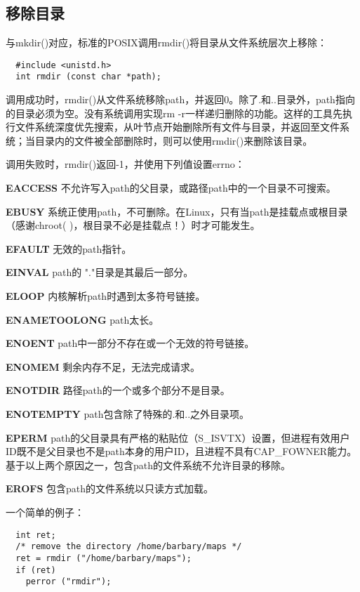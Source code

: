 \subsection{移除目录}

与mkdir()对应，标准的POSIX调用rmdir()将目录从文件系统层次上移除：

\begin{lstlisting}
  #include <unistd.h>
  int rmdir (const char *path);
\end{lstlisting}

调用成功时，rmdir()从文件系统移除path，并返回0。除了.和..目录外，path指向的目录必须为空。没有系统调用实现rm -r一样递归删除的功能。这样的工具先执行文件系统深度优先搜索，从叶节点开始删除所有文件与目录，并返回至文件系统；当目录内的文件被全部删除时，则可以使用rmdir()来删除该目录。

调用失败时，rmdir()返回-1，并使用下列值设置errno：

\begin{eqlist*}
\item[\textbf{EACCESS}] 不允许写入path的父目录，或路径path中的一个目录不可搜索。
\item[\textbf{EBUSY}] 系统正使用path，不可删除。在Linux，只有当path是挂载点或根目录（感谢chroot( )，根目录不必是挂载点！）时才可能发生。 
\item[\textbf{EFAULT}] 无效的path指针。
\item[\textbf{EINVAL}] path的 "."目录是其最后一部分。
\item[\textbf{ELOOP}] 内核解析path时遇到太多符号链接。
\item[\textbf{ENAMETOOLONG}] path太长。
\item[\textbf{ENOENT}] path中一部分不存在或一个无效的符号链接。
\item[\textbf{ENOMEM}] 剩余内存不足，无法完成请求。
\item[\textbf{ENOTDIR}] 路径path的一个或多个部分不是目录。
\item[\textbf{ENOTEMPTY}] path包含除了特殊的.和..之外目录项。
\item[\textbf{EPERM}] path的父目录具有严格的粘贴位（S\_ISVTX）设置，但进程有效用户ID既不是父目录也不是path本身的用户ID，且进程不具有CAP\_FOWNER能力。基于以上两个原因之一，包含path的文件系统不允许目录的移除。 
\item[\textbf{EROFS}] 包含path的文件系统以只读方式加载。
\end{eqlist*}

一个简单的例子：

\begin{lstlisting}
  int ret;
  /* remove the directory /home/barbary/maps */
  ret = rmdir ("/home/barbary/maps");
  if (ret)
    perror ("rmdir");
\end{lstlisting}

